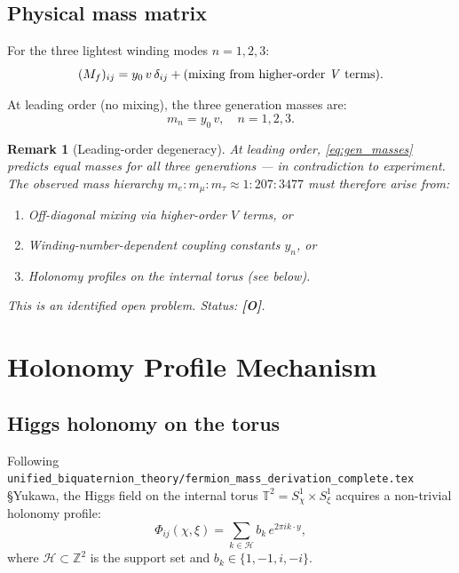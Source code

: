 \documentclass[11pt,a4paper]{article}
\newtheorem{remark}{Remark}
\begin{document}
\subsection{Physical mass matrix}

For the three lightest winding modes $n = 1, 2, 3$:
\begin{equation}
\label{eq:mass_matrix}
  (M_f)_{ij} = y_{0}\,v\,\delta_{ij}
    + \text{(mixing from higher-order \textit{V} terms)}.
\end{equation}

At leading order (no mixing), the three generation masses are:
\begin{equation}
\label{eq:gen_masses}
  m_n = y_0\, v, \quad n = 1, 2, 3.
\end{equation}

\begin{remark}[Leading-order degeneracy]
  At leading order, \eqref{eq:gen_masses} predicts equal masses for all
  three generations — in contradiction to experiment.  The observed
  mass hierarchy $m_e : m_\mu : m_\tau \approx 1 : 207 : 3477$ must
  therefore arise from:
  \begin{enumerate}
    \item Off-diagonal mixing via higher-order $V$ terms, or
    \item Winding-number-dependent coupling constants $y_n$, or
    \item Holonomy profiles on the internal torus (see below).
  \end{enumerate}
  This is an identified open problem.  Status: \textbf{[O]}.
\end{remark}

\section{Holonomy Profile Mechanism}
\label{sec:holonomy}

\subsection{Higgs holonomy on the torus}

Following \texttt{unified\_biquaternion\_theory/fermion\_mass\_derivation\_complete.tex}
§Yukawa, the Higgs field on the internal torus $\mathbb{T}^2 = S^1_\chi \times S^1_\xi$
acquires a non-trivial holonomy profile:
\begin{equation}
\label{eq:holonomy}
  \Phi_{ij}(\chi, \xi) = \sum_{k \in \mathcal{H}} b_k\, e^{2\pi i k \cdot y},
\end{equation}
where $\mathcal{H} \subset \mathbb{Z}^2$ is the support set and
$b_k \in \{1, -1, i, -i\}$.
\end{document}
